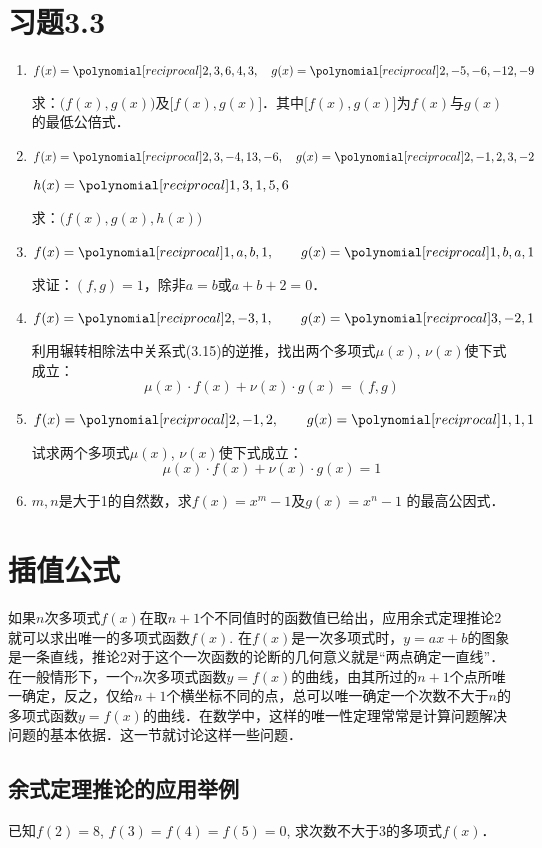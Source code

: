 \section*{习题3.3}

\begin{enumerate}
    \item $f(x)=\poly{2,3,6,4,3},\quad g(x)=\poly{2,-5,-6,-12,-9}$

求：$\bigl(f(x),g(x)\bigr)$及$\bigl[f(x),g(x)\bigr]$．其中$\bigl[f(x),g(x)\bigr]$为$f(x)$与$g(x)$的最低公倍式．

\item $f(x)=\poly{2,3,-4,13,-6},\quad g(x)=\poly{2,-1,2,3,-2}$

$h(x)=\poly{1,3,1,5,6}$

求：$\bigl(f(x),g(x),h(x)\bigr)$

\item $f(x)=\poly{1,a,b,1},\qquad g(x)=\poly{1,b,a,1}$

求证：$(f,g)=1$，除非$a=b$或$a+b+2=0$．
\item $f(x)=\poly{2,-3,1},\qquad g(x)=\poly{3,-2,1}$

利用辗转相除法中关系式(3.15)的逆推，找出两个多项式$\mu(x)$, $\nu(x)$使下式成立：
\[\mu(x)\cdot f(x)+\nu(x)\cdot g(x)=(f,g)\]

\item $f(x)=\poly{2,-1,2},\qquad g(x)=\poly{1,1,1}$

试求两个多项式$\mu(x)$, $\nu(x)$使下式成立：
\[\mu(x)\cdot f(x)+\nu(x)\cdot g(x)=1\]

\item $m,n$是大于1的自然数，求$f(x)=x^m-1$及$g(x)=x^n-1$
的最高公因式．
\end{enumerate}


\section{插值公式}
如果$n$次多项式$f(x)$在取$n+1$个不同值时的函数值已给出，应用余式定理推论2就可以求出唯一的多项式函数$f(x)$. 在$f(x)$是一次多项式时，$y=ax+b$的图象是一条直线，推论2对于这个一次函数的论断的几何意义就是“两点确定一直线”．在一般情形下，一个$n$次多项式函数$y=f(x)$的曲线，由其所过的$n+1$个点所唯一确定，反之，仅给$n+1$个横坐标不同的点，总可以唯一确定一个次数不大于$n$的多项式函数$y=f(x)$的曲线．在数学中，这样的唯一性定理常常是计算问题解决问题的基本依据．这一节就讨论这样一些问题．

\subsection{余式定理推论的应用举例}
\begin{example}
    已知$f(2)=8$, $f(3)=f(4)=f(5)=0$, 求次数不大于3的多项式$f(x)$．
\end{example}

